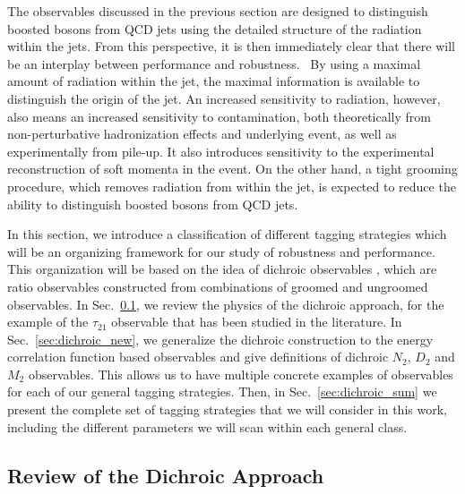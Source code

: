\documentclass[11pt,letterpaper]{article}
\DeclareRobustCommand{\Sec}[1]{Sec.~\ref{#1}}
\begin{document}
The observables discussed in the previous section are designed to
distinguish boosted bosons from QCD jets using the detailed structure
of the radiation within the jets.
%
From this perspective, it is then
immediately clear that there will be an interplay between performance
and robustness.\
%
By using a maximal amount of radiation within the jet,
the maximal information is available to distinguish the origin of the
jet.
%
An increased sensitivity to radiation, however, also means an
increased sensitivity to contamination, both theoretically from
non-perturbative hadronization effects and underlying event, as well
as experimentally from pile-up.
%
It also introduces sensitivity to the
experimental reconstruction of soft momenta in the event.
%
On the other
hand, a tight grooming procedure, which removes radiation from within
the jet, is expected to reduce the ability to distinguish boosted
bosons from QCD jets.

In this section, we introduce a classification of different tagging strategies which will be an organizing framework for our study of robustness and performance.
%
This organization will be based on the idea of dichroic observables \cite{Salam:2016yht}, which are ratio observables constructed from combinations of groomed and ungroomed observables.
%
In \Sec{sec:dichroic}, we review the physics of the dichroic approach, for the example of the $\tau_{21}$ observable that has been studied in the literature.
%
In \Sec{sec:dichroic_new}, we generalize the dichroic construction to the energy correlation function based observables and give definitions of dichroic $N_2$, $D_2$ and $M_2$ observables.
%
This allows us to have multiple concrete examples of observables for each of our general tagging strategies.
%
Then, in \Sec{sec:dichroic_sum} we present the complete set of tagging strategies that we will consider in this work, including the different parameters we will scan within each general class.



\subsection{Review of the Dichroic Approach}\label{sec:dichroic}
\end{document}
